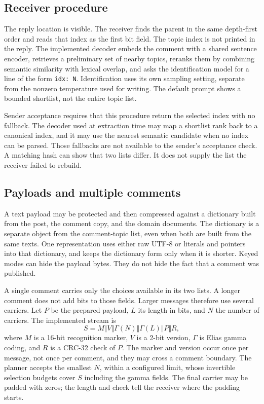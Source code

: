 \documentclass[3p,times,procedia]{elsarticle}
\begin{document}
\subsection{Receiver procedure}

The reply location is visible. The receiver finds the parent in the same depth-first order and reads that index as the first bit field. The topic index is not printed in the reply. The implemented decoder embeds the comment with a shared sentence encoder, retrieves a preliminary set of nearby topics, reranks them by combining semantic similarity with lexical overlap, and asks the identification model for a line of the form \texttt{idx: N}. Identification uses its own sampling setting, separate from the nonzero temperature used for writing. The default prompt shows a bounded shortlist, not the entire topic list.

Sender acceptance requires that this procedure return the selected index with no fallback. The decoder used at extraction time may map a shortlist rank back to a canonical index, and it may use the nearest semantic candidate when no index can be parsed. Those fallbacks are not available to the sender's acceptance check. A matching hash can show that two lists differ. It does not supply the list the receiver failed to rebuild.

\subsection{Payloads and multiple comments}

A text payload may be protected and then compressed against a dictionary built from the post, the comment copy, and the domain documents. The dictionary is a separate object from the comment-topic list, even when both are built from the same texts. One representation uses either raw UTF-8 or literals and pointers into that dictionary, and keeps the dictionary form only when it is shorter. Keyed modes can hide the payload bytes. They do not hide the fact that a comment was published.

A single comment carries only the choices available in its two lists. A longer comment does not add bits to those fields. Larger messages therefore use several carriers. Let $P$ be the prepared payload, $L$ its length in bits, and $N$ the number of carriers. The implemented stream is
\[
S=M\Vert V\Vert\Gamma(N)\Vert\Gamma(L)\Vert P\Vert R,
\]
where $M$ is a 16-bit recognition marker, $V$ is a 2-bit version, $\Gamma$ is Elias gamma coding, and $R$ is a CRC-32 check of $P$. The marker and version occur once per message, not once per comment, and they may cross a comment boundary. The planner accepts the smallest $N$, within a configured limit, whose invertible selection budgets cover $S$ including the gamma fields. The final carrier may be padded with zeros; the length and check tell the receiver where the padding starts.
\end{document}
